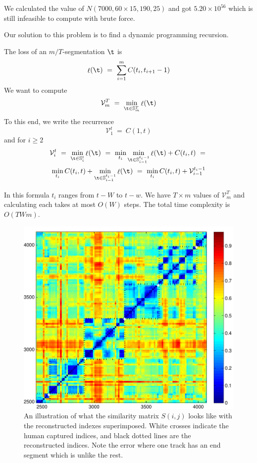 \documentclass[twocolumn]{article}
\DeclareMathOperator{\loss}{\ell}
\newcommand{\segs}{\mathbb S}
\newcommand{\best}{\mathcal V}
\begin{document}
	We calculated the value of $N(7000, 60\times15, 190, 25)$ and got $5.20 \times 10^{56}$ which is still infeasible to compute with brute force.
	
	
	
	Our solution to this problem is to find a dynamic programming recursion.
	
	The loss of an $m/T$-segmentation $\t$ is 
	\[
	\loss(\t) 
	~=~
	\sum_{i=1}^m C(t_i, t_{i+1}-1)
	\]
	We want to compute
	\[
	\best^T_m ~=~ \min_{\t \in \segs^T_m} \loss(\t)
	\]
	To this end, we write the recurrence
	\begin{equation*}
		\best^t_1 ~=~ C(1, t) 
	\end{equation*}
	and for $i\ge2$
	\begin{multline*}
		\best^t_i ~=~
		\min_{\t \in \segs^t_i} \loss(\t)
		~=~ \min_{t_i} \min_{\t \in \segs^{t_i-1}_{i-1}} \loss(\t) + C(t_i, t)~=~  \\
		\min_{t_i} C(t_i, t) + \min_{\t \in \segs^{t_i-1}_{i-1}} \loss(\t) 
		~=~ \min_{t_i} C(t_i, t) + \best^{t_i-1}_{i-1}
	\end{multline*}
	
	In this formula $t_i$ ranges from $t-W$ to $t-w$. We have $T \times m$ values of $\best^T_m$ and calculating each takes at most $O(W)$ steps. The total time complexity is $O(TWm)$.
	
	\begin{figure}[t]
		\centering
		\includegraphics[width=\textwidth]{images/simmat_preds}
		
		\caption{An illustration of what the similarity matrix $S(i,j)$ looks like with the reconstructed indexes superimposed. White crosses indicate the human captured indices, and black dotted lines are the reconstructed indices. Note the error where one track has an end segment which is unlike the rest. }
		\label{fig:predictions}
	\end{figure} 
	
\end{document}
